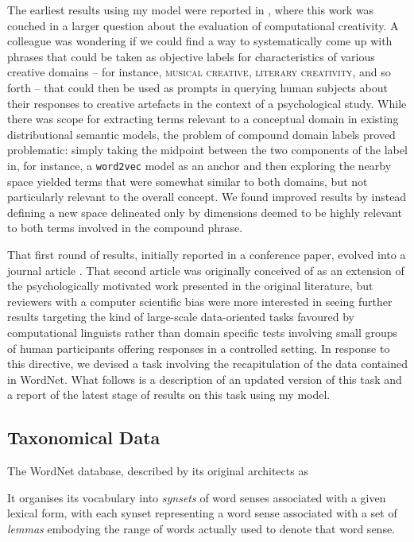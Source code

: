 The earliest results using my model were reported in \cite{AgresEA2015}, where this work was couched in a larger question about the evaluation of computational creativity.  A colleague was wondering if we could find a way to systematically come up with phrases that could be taken as objective labels for characteristics of various creative domains -- for instance, \textsc{musical creative}, \textsc{literary creativity}, and so forth -- that could then be used as prompts in querying human subjects about their responses to creative artefacts in the context of a psychological study.  While there was scope for extracting terms relevant to a conceptual domain in existing distributional semantic models, the problem of compound domain labels proved problematic: simply taking the midpoint between the two components of the label in, for instance, a \texttt{word2vec} model as an anchor and then exploring the nearby space yielded terms that were somewhat similar to both domains, but not particularly relevant to the overall concept.  We found improved results by instead defining a new space delineated only by dimensions deemed to be highly relevant to both terms involved in the compound phrase.

That first round of results, initially reported in a conference paper, evolved into a journal article \citep{McGregorEA2015c}.  That second article was originally conceived of as an extension of the psychologically motivated work presented in the original literature, but reviewers with a computer scientific bias were more interested in seeing further results targeting the kind of large-scale data-oriented tasks favoured by computational linguists rather than domain specific tests involving small groups of human participants offering responses in a controlled setting.  In response to this directive, we devised a task involving the recapitulation of the data contained in WordNet.  What follows is a description of an updated version of this task and a report of the latest stage of results on this task using my model.

\subsection{Taxonomical Data}
The WordNet database, described by its original architects as 

It organises its vocabulary into \emph{synsets} of word senses associated with a given lexical form, with each synset representing a word sense associated with a set of \emph{lemmas} embodying the range of words actually used to denote that word sense.

